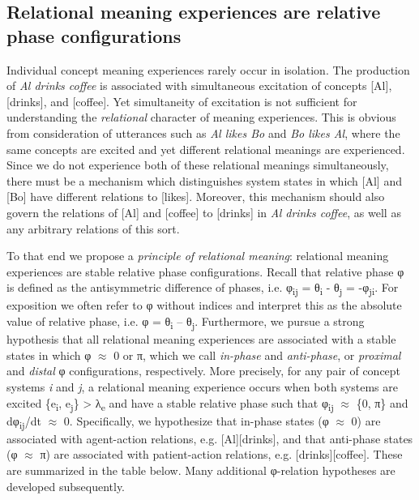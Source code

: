 \subsection{Relational meaning experiences are relative phase configurations}

Individual concept meaning experiences rarely occur in isolation. The production of \textit{Al drinks coffee} is associated with simultaneous excitation of concepts [Al], [drinks], and [coffee]. Yet simultaneity of excitation is not sufficient for understanding the \textit{relational} character of meaning experiences. This is obvious from consideration of utterances such as \textit{Al likes Bo} and \textit{Bo likes Al}, where the same concepts are excited and yet different relational meanings are experienced. Since we do not experience both of these relational meanings simultaneously, there must be a mechanism which distinguishes system states in which [Al] and [Bo] have different relations to [likes]. Moreover, this mechanism should also govern the relations of [Al] and [coffee] to [drinks] in \textit{Al drinks coffee}, as well as any arbitrary relations of this sort. 

  To that end we propose a \textit{principle of relational meaning}: relational meaning experiences are stable relative phase configurations. Recall that relative phase φ is defined as the antisymmetric difference of phases, i.e. φ\textsubscript{ij} = θ\textsubscript{i} - θ\textsubscript{j} = -φ\textsubscript{ji}. For exposition we often refer to φ without indices and interpret this as the absolute value of relative phase, i.e. {\textbar}φ{\textbar} = {\textbar}θ\textsubscript{i} – θ\textsubscript{j}{\textbar}. Furthermore, we pursue a strong hypothesis that all relational meaning experiences are associated with a stable states in which φ ${\approx}$ 0 or π, which we call \textit{in-phase} and \textit{anti-phase}, or \textit{proximal} and \textit{distal} φ configurations, respectively. More precisely, for any pair of concept systems \textit{i} and \textit{j}, a relational meaning experience occurs when both systems are excited \{e\textsubscript{i}, e\textsubscript{j}\} > λ\textsubscript{e} and have a stable relative phase such that {\textbar}φ\textsubscript{ij}{\textbar} ${\approx}$ \{0, π\} and dφ\textsubscript{ij}/dt ${\approx}$ 0. Specifically, we hypothesize that in-phase states (φ ${\approx}$ 0) are associated with agent-action relations, e.g. [Al][drinks], and that anti-phase states (φ ${\approx}$ π) are associated with patient-action relations, e.g. [drinks][coffee]. These are summarized in the table below. Many additional φ-relation hypotheses are developed subsequently.

